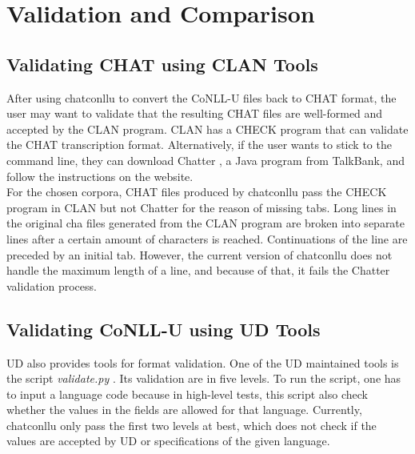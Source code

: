 \chapter{Validation and Comparison} %

\label{Chapter5} %

\section{Validating CHAT using CLAN Tools}

After using chatconllu to convert the CoNLL-U files back to CHAT format, the user may want to validate that the resulting CHAT files are well-formed and accepted by the CLAN program. CLAN has a CHECK program  that can validate the CHAT transcription format. Alternatively, if the user wants to stick to the command line, they can download Chatter , a Java program from TalkBank, and follow the instructions on the website.\\


For the chosen corpora, CHAT files produced by chatconllu pass the CHECK program in CLAN but not Chatter for the reason of missing tabs. Long lines in the original cha files generated from the CLAN program are broken into separate lines after a certain amount of characters is reached. Continuations of the line are preceded by an initial tab. However, the current version of chatconllu does not handle the maximum length of a line, and because of that, it fails the Chatter validation process.\\

\section{Validating CoNLL-U using UD Tools}

UD also provides tools for format validation. One of the UD maintained tools is the script \emph{validate.py} . Its validation are in five levels. To run the script, one has to input a language code because in high-level tests, this script also check whether the values in the fields are allowed for that language. Currently, chatconllu only pass the first two levels at best, which does not check if the values are accepted by UD or specifications of the given language.

